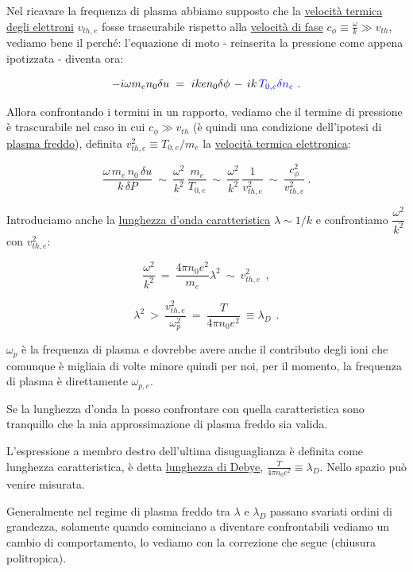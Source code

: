 Nel ricavare la frequenza di plasma abbiamo supposto che la \underline{velocità termica degli elettroni} $v_{th, e}$ fosse trascurabile rispetto alla \underline{velocità di fase} 
$\boxed{c_\phi \equiv \displaystyle\frac{\omega}{k}\gg v_{th}}$, vediamo bene il perché:
l'equazione di moto - reinserita la pressione come appena ipotizzata - diventa ora: 

\[-i\omega m_en_0\delta u\ =\ iken_0\delta \phi\, -\, ik\,\color{blue}T_{0,e} \delta n_e\color{black}\ .\]

Allora confrontando i termini in un rapporto, vediamo che il termine di pressione è trascurabile nel caso in cui $\boxed{c_\phi\gg v_{th}}$ (è quindi una condizione dell'ipotesi di \underline{plasma freddo}), definita $\boxed{v_{th, e}^2\equiv T_{0, e}/m_e}$ la \underline{velocità termica elettronica}:

\[\frac{\omega\, m_e\,n_0\,\delta u}{k\,\delta P}\ \sim\ \frac{\omega^2}{k^2}\, \frac{m_e}{T_{0,e}}\ \sim\ \frac{\omega^2}{k^2}\, \frac{1}{v^2_{th,e}}\ \sim\ \frac{c^2_{\phi}}{v^2_{th,e}}\ .\] 

\vspace{0.3cm}
Introduciamo anche la \underline{lunghezza d'onda caratteristica} $\lambda\sim 1/k$ e confrontiamo $\dfrac{\omega^2}{k^2}$ con $v_{th,e}^2$:

\[\dfrac{\omega^2}{k^2}\ =\ \frac{4\pi n_0 e^2}{m_e}\lambda^2\ \sim\ v_{th,e}^2\ \ ,\] 

\[\lambda^2\ >\ \frac{v_{th,e}^2}{\omega_p^2}\ =\ \frac{T}{4\pi n_0e^2}\ \equiv \lambda_D\ \ .\] 

$\omega_p$ è la frequenza di plasma e dovrebbe avere anche il contributo degli ioni che comunque è migliaia di volte minore quindi per noi, per il momento, la frequenza di plasma è direttamente $\omega_{p,e}$. 

Se la lunghezza d'onda la posso confrontare con quella caratteristica sono tranquillo che la mia approssimazione di plasma freddo sia valida. 

L'espressione a membro destro dell'ultima disuguaglianza è definita come lunghezza caratteristica, è detta \underline{lunghezza di Debye}, $\frac{T}{4\pi n_0e^2}\equiv \lambda_D$. Nello spazio può venire misurata. 

Generalmente nel regime di plasma freddo tra $\lambda$ e $\lambda_D$ passano svariati ordini di grandezza, solamente quando cominciano a diventare confrontabili vediamo un cambio di comportamento, lo vediamo con la correzione che segue (chiusura politropica).

